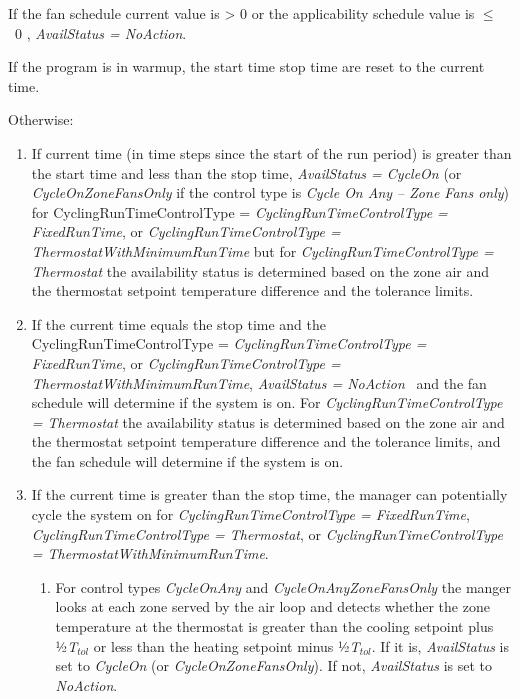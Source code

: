 If the fan schedule current value is \textgreater{} 0 or the applicability schedule value is \(\le\) ~0 , \emph{AvailStatus = NoAction}.

If the program is in warmup, the start time stop time are reset to the current time.

Otherwise:

\begin{enumerate}
\item  If current time (in time steps since the start of the run period) is greater than the start time and less than the stop time, \emph{AvailStatus = CycleOn} (or \emph{CycleOnZoneFansOnly} if the control type is \emph{Cycle On Any -- Zone Fans only}) for CyclingRunTimeControlType = \emph{CyclingRunTimeControlType = FixedRunTime}, or \emph{CyclingRunTimeControlType = ThermostatWithMinimumRunTime} but for \emph{CyclingRunTimeControlType = Thermostat} the availability status is determined based on the zone air and the thermostat setpoint temperature difference and the tolerance limits.  

\item  If the current time equals the stop time and the CyclingRunTimeControlType = \emph{CyclingRunTimeControlType = FixedRunTime}, or \emph{CyclingRunTimeControlType = ThermostatWithMinimumRunTime}, \emph{AvailStatus = NoAction} ~and the fan schedule will determine if the system is on. For \emph{CyclingRunTimeControlType = Thermostat} the availability status is determined based on the zone air and the thermostat setpoint temperature difference and the tolerance limits, and the fan schedule will determine if the system is on.

\item  If the current time is greater than the stop time, the manager can potentially cycle the system on for \emph{CyclingRunTimeControlType = FixedRunTime}, \emph{CyclingRunTimeControlType = Thermostat}, or \emph{CyclingRunTimeControlType = ThermostatWithMinimumRunTime}.

  \begin{enumerate}
  \item  For control types \emph{CycleOnAny} and \emph{CycleOnAnyZoneFansOnly} the manger looks at each zone served by the air loop and detects whether the zone temperature at the thermostat is greater than the cooling setpoint plus ½\emph{T\(_{tol}\)} or less than the heating setpoint minus ½\emph{T\(_{tol}\)}. If it is, \emph{AvailStatus} is set to \emph{CycleOn} (or \emph{CycleOnZoneFansOnly}). If not, \emph{AvailStatus} is set to \emph{NoAction}.


\end{enumerate}
\end{enumerate}
